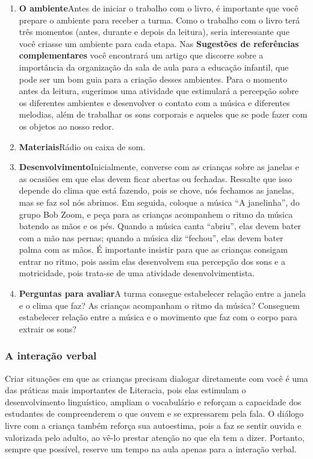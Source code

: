 \documentclass[11pt]{extarticle}
\begin{document}
\begin{enumerate}
\item \textbf{O ambiente}\quad Antes de iniciar o trabalho com o livro, é importante que você 
prepare o ambiente para receber a turma. Como o trabalho com o livro terá 
três momentos (antes, durante e depois da leitura), seria interessante que você 
criasse um ambiente para cada etapa. Nas \textbf{Sugestões de referências complementares} 
você encontrará um artigo que discorre sobre a importância da organização da sala 
de aula para a educação infantil, que pode ser um bom guia para a criação desses 
ambientes.
Para o momento antes da leitura, sugerimos uma atividade que estimulará a percepção sobre os diferentes ambientes e desenvolver o contato com a música e diferentes melodias, além de trabalhar os sons corporais e aqueles que se pode fazer com os objetos ao nosso redor. 

\item \textbf{Materiais}\quad Rádio ou caixa de som.

\item \textbf{Desenvolvimento}\quad Inicialmente, converse com as crianças sobre as janelas e as ocasiões em que elas devem ficar abertas ou fechadas. Ressalte que isso depende do clima que está fazendo, pois se chove, nós fechamos as janelas, mas se faz sol nós abrimos. Em seguida, coloque a música “A janelinha”, do grupo Bob Zoom, e peça para as crianças acompanhem o ritmo da música batendo as mãos e os pés. Quando a música canta “abriu”, elas devem bater com a mão nas pernas; quando a música diz “fechou”, elas devem bater palma com as mãos. É importante insistir para que as crianças consigam entrar no ritmo, pois assim elas desenvolvem sua percepção dos sons e a motricidade, pois trata-se de uma atividade desenvolvimentista.

\item \textbf{Perguntas para avaliar}\quad A turma consegue estabelecer relação entre a janela e o clima que faz? As crianças acompanham o ritmo da música? Conseguem estabelecer relação entre a música e o movimento que faz com o corpo para extrair os sons? 

\end{enumerate}


\subsubsection{A interação verbal} 
Criar situações em que as crianças precisam dialogar diretamente com 
você é uma das práticas mais importantes de Literacia, pois elas estimulam 
o desenvolvimento linguístico, ampliam o vocabulário e reforçam a 
capacidade dos estudantes de compreenderem o que ouvem e se expressarem 
pela fala. O diálogo livre com a criança também reforça sua autoestima, pois 
a faz se sentir ouvida e valorizada pelo adulto, ao vê-lo prestar atenção 
no que ela tem a dizer. Portanto, sempre que possível, reserve um tempo na 
aula apenas para a interação verbal. 
\end{document}
